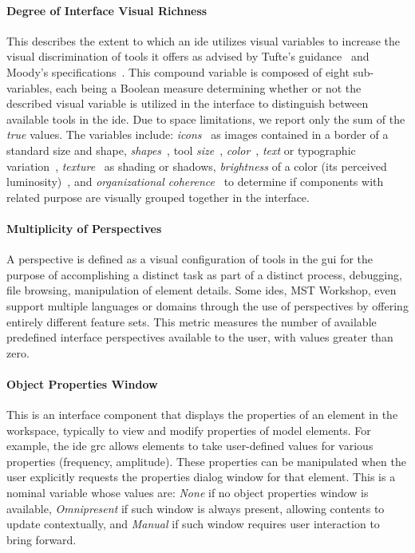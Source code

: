 \paragraph{Degree of Interface Visual Richness}
This describes the extent to which an \ac{ide} utilizes visual variables to increase the visual discrimination of tools it offers as advised by Tufte's guidance~\cite{Tufte2001} and Moody's specifications~\cite{moody2009}.
This compound variable is composed of eight sub-variables, each being a Boolean measure determining whether or not the described visual variable is utilized in the interface to distinguish between available tools in the \ac{ide}.
Due to space limitations, we report only the sum of the \textsl{true} values.
The variables include:
\emph{icons}~\cite{costagliola2002,moody2009} as images contained in a border of a standard size and shape,
\emph{shapes}~\cite{moody2009},
tool \emph{size}~\cite{moody2009},
\emph{color}~\cite{moody2009},
\emph{text} or typographic variation~\cite{moody2009},
\emph{texture}~\cite{moody2009} as shading or shadows,
\emph{brightness} of a color (\ie its perceived luminosity)~\cite{moody2009},
and
\emph{organizational coherence}~\cite{constantine1996} to determine if components with related purpose are visually grouped together in the interface.


\paragraph{Multiplicity of Perspectives}
A perspective is defined as a visual configuration of tools in the \ac{gui}
for the purpose of accomplishing a distinct task as part of a distinct
process, \eg debugging, file browsing, manipulation of element details.
Some \acp{ide}, \eg MST Workshop, even support multiple languages or
domains through the use of perspectives by offering entirely different
feature sets. This metric measures the number of available predefined
interface perspectives available to the user, with values greater than
zero.


\paragraph{Object Properties Window}
This is an interface component that displays the properties of an element
in the workspace, typically to view and modify properties of model
elements. For example, the \ac{ide} \ac{grc} allows elements to take
user-defined values for various properties (\eg frequency, amplitude).
These properties can be manipulated when the user explicitly requests the
properties dialog window for that element.
This is a nominal variable whose values are:
\textsl{None} if no object properties window is available,
\textsl{Omnipresent} if such window is always present, allowing contents to update contextually,
and \textsl{Manual} if such window requires user interaction to bring forward.


